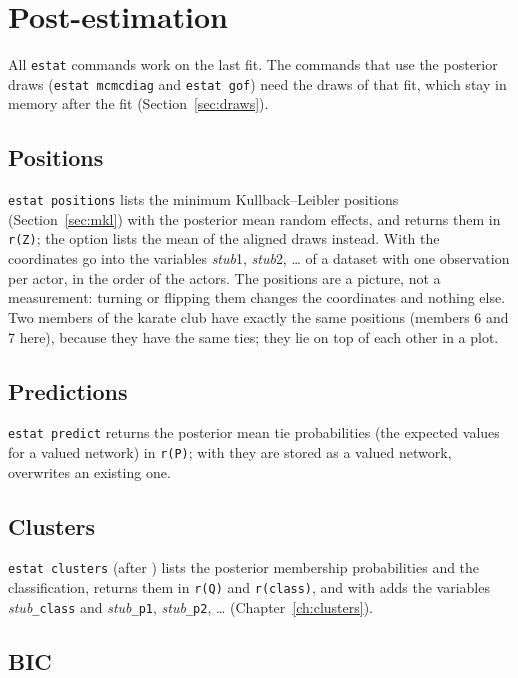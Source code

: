 \chapter{Post-estimation}\label{ch:postest}

All \texttt{estat} commands work on the last fit. The commands that use the posterior draws (\texttt{estat mcmcdiag} and \texttt{estat gof}) need the draws of that fit, which stay in memory after the fit (Section~\ref{sec:draws}).

\section{Positions}

\texttt{estat positions} lists the minimum Kullback--Leibler positions (Section~\ref{sec:mkl}) with the posterior mean random effects, and returns them in \texttt{r(Z)}; the option  lists the mean of the aligned draws instead. With  the coordinates go into the variables \emph{stub}1, \emph{stub}2, \dots{} of a dataset with one observation per actor, in the order of the actors.
The positions are a picture, not a measurement: turning or flipping them changes the coordinates and nothing else. Two members of the karate club have exactly the same positions (members 6 and 7 here), because they have the same ties; they lie on top of each other in a plot.

\section{Predictions}

\texttt{estat predict} returns the posterior mean tie probabilities (the expected values for a valued network) in \texttt{r(P)}; with  they are stored as a valued network,  overwrites an existing one.

\section{Clusters}

\texttt{estat clusters} (after ) lists the posterior membership probabilities and the classification, returns them in \texttt{r(Q)} and \texttt{r(class)}, and with  adds the variables \emph{stub}\texttt{\_class} and \emph{stub}\texttt{\_p1}, \emph{stub}\texttt{\_p2}, \dots{} (Chapter~\ref{ch:clusters}).

\section{BIC}

